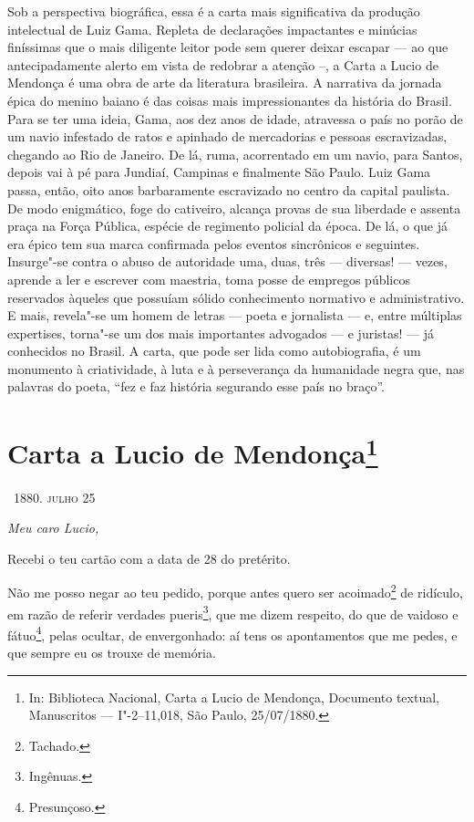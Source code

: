 {\small\noindent
Sob a perspectiva biográfica, essa é a carta mais significativa da
produção intelectual de Luiz Gama. Repleta de declarações impactantes e
minúcias finíssimas que o mais diligente leitor pode sem querer deixar
escapar --- ao que antecipadamente alerto em vista de redobrar a atenção
--, a Carta a Lucio de Mendonça é uma obra de arte da literatura
brasileira. A narrativa da jornada épica do menino baiano é das coisas
mais impressionantes da história do Brasil. Para se ter uma ideia, Gama,
aos dez anos de idade, atravessa o país no porão de um navio infestado
de ratos e apinhado de mercadorias e pessoas escravizadas, chegando ao
Rio de Janeiro. De lá, ruma, acorrentado em um navio, para Santos,
depois vai à pé para Jundiaí, Campinas e finalmente São Paulo. Luiz Gama
passa, então, oito anos barbaramente escravizado no centro da capital
paulista. De modo enigmático, foge do cativeiro, alcança provas de sua
liberdade e assenta praça na Força Pública, espécie de regimento
policial da época. De lá, o que já era épico tem sua marca confirmada
pelos eventos sincrônicos e seguintes. Insurge"-se contra o abuso de
autoridade uma, duas, três --- diversas! --- vezes, aprende a ler e
escrever com maestria, toma posse de empregos públicos reservados
àqueles que possuíam sólido conhecimento normativo e administrativo. E
mais, revela"-se um homem de letras --- poeta e jornalista --- e, entre
múltiplas expertises, torna"-se um dos mais importantes advogados --- e
juristas! --- já conhecidos no Brasil. A carta, que pode ser lida como
autobiografia, é um monumento à criatividade, à luta e à perseverança da
humanidade negra que, nas palavras do poeta, ``fez e faz história
segurando esse país no braço''. }


\chapter{Carta a Lucio de Mendonça\footnote[*]{In: Biblioteca
  Nacional, Carta a Lucio de Mendonça, Documento textual, Manuscritos ---
  I"-2--11,018, São Paulo, 25/07/1880.}}


\hfill\ \textsc{1880. julho 25}

\noindent\textit{Meu caro Lucio,}\smallskip

Recebi o teu cartão com a data de 28 do pretérito.

Não me posso negar ao teu pedido, porque antes quero ser
acoimado\footnote{Tachado.} de ridículo, em razão de referir verdades
pueris\footnote{Ingênuas.}, que me dizem respeito, do que de vaidoso e
fátuo\footnote{Presunçoso.}, pelas ocultar, de envergonhado: aí tens
os apontamentos que me pedes, e que sempre eu os trouxe de memória.

